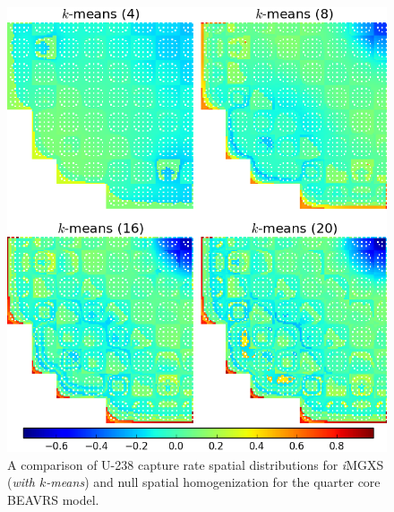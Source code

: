 \begin{figure}[h!]
\centering
\includegraphics[width=0.9\linewidth]{figures/results/compare/full-core/compare-capt-kmeans}
\vspace{2mm}
\caption[U-238 capture rate comparison for the quarter core BEAVRS model]{A comparison of U-238 capture rate spatial distributions for \textit{i}\ac{MGXS} (\textit{with $k$-means}) and null spatial homogenization for the quarter core BEAVRS model.}
\label{fig:chap11-assm-full-core-capt-rates-kmeans-comp}
\end{figure}

\clearpage

